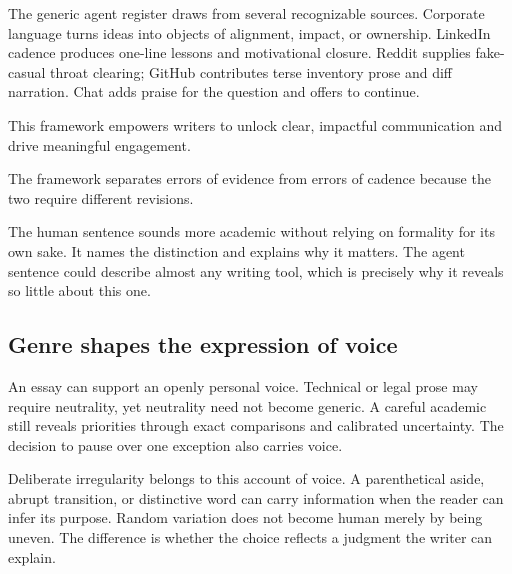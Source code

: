 The generic agent register draws from several recognizable sources. Corporate
language turns ideas into objects of alignment, impact, or ownership. LinkedIn
cadence produces one-line lessons and motivational closure. Reddit supplies
fake-casual throat clearing; GitHub contributes terse inventory prose and diff
narration. Chat adds praise for the question and offers to continue.

\agentdraft

This framework empowers writers to unlock clear, impactful communication and
drive meaningful engagement.

\humanrevision

The framework separates errors of evidence from errors of cadence because the
two require different revisions.

The human sentence sounds more academic without relying on formality for its
own sake. It names the distinction and explains why it matters. The agent
sentence could describe almost any writing tool, which is precisely why it
reveals so little about this one.

\subsection{Genre shapes the expression of voice}

An essay can support an openly personal voice. Technical or legal prose may
require neutrality, yet neutrality need not become generic. A careful academic
still reveals priorities through exact comparisons and calibrated uncertainty.
The decision to pause over one exception also carries voice.

Deliberate irregularity belongs to this account of voice. A parenthetical
aside, abrupt transition, or distinctive word can carry information when the
reader can infer its purpose. Random variation does not become human merely by
being uneven. The difference is whether the choice reflects a judgment the
writer can explain.
